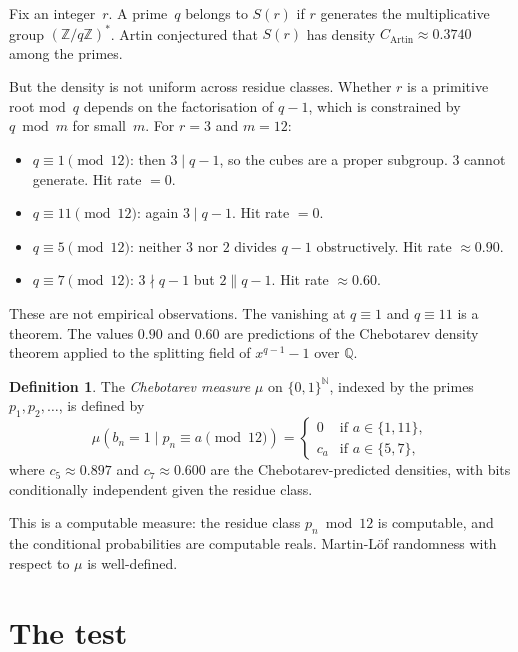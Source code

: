 \documentclass[11pt]{article}
\theoremstyle{definition}
\newtheorem{definition}[theorem]{Definition}
\theoremstyle{remark}
\begin{document}
Fix an integer~$r$.
A prime~$q$ belongs to $S(r)$ if $r$ generates
the multiplicative group $(\mathbb{Z}/q\mathbb{Z})^*$.
Artin conjectured that $S(r)$ has density
$C_{\mathrm{Artin}} \approx 0.3740$ among the primes.

But the density is not uniform across residue classes.
Whether $r$ is a primitive root mod~$q$ depends on
the factorisation of $q - 1$,
which is constrained by $q \bmod m$ for small~$m$.
For $r = 3$ and $m = 12$:

\begin{itemize}
\item $q \equiv 1 \pmod{12}$: then $3 \mid q - 1$,
  so the cubes are a proper subgroup.
  $3$ cannot generate. Hit rate $= 0$.
\item $q \equiv 11 \pmod{12}$: again $3 \mid q - 1$. Hit rate $= 0$.
\item $q \equiv 5 \pmod{12}$: neither $3$ nor $2$
  divides $q - 1$ obstructively. Hit rate $\approx 0.90$.
\item $q \equiv 7 \pmod{12}$: $3 \nmid q - 1$ but $2 \| q - 1$.
  Hit rate $\approx 0.60$.
\end{itemize}

These are not empirical observations.
The vanishing at $q \equiv 1$ and $q \equiv 11$ is a theorem.
The values $0.90$ and $0.60$ are predictions of the
Chebotarev density theorem applied to the splitting field
of $x^{q-1} - 1$ over $\mathbb{Q}$.

\begin{definition}
The \emph{Chebotarev measure} $\mu$ on $\{0,1\}^{\mathbb{N}}$,
indexed by the primes $p_1, p_2, \ldots$, is defined by
\[
  \mu(b_n = 1 \mid p_n \equiv a \pmod{12})
  = \begin{cases}
    0 & \text{if } a \in \{1, 11\}, \\
    c_a & \text{if } a \in \{5, 7\},
  \end{cases}
\]
where $c_5 \approx 0.897$ and $c_7 \approx 0.600$
are the Chebotarev-predicted densities,
with bits conditionally independent given the residue class.
\end{definition}

This is a computable measure:
the residue class $p_n \bmod 12$ is computable,
and the conditional probabilities are computable reals.
Martin-L\"of randomness with respect to $\mu$ is well-defined.

\section{The test}
\end{document}

